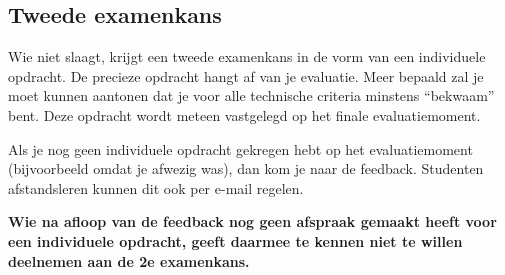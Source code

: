 \subsection{Tweede examenkans}%
\label{subs:tweede-examenkans}

Wie niet slaagt, krijgt een tweede examenkans in de vorm van een individuele opdracht. De precieze opdracht hangt af van je evaluatie. Meer bepaald zal je moet kunnen aantonen dat je voor alle technische criteria minstens ``bekwaam'' bent. Deze opdracht wordt meteen vastgelegd op het finale evaluatiemoment.

Als je nog geen individuele opdracht gekregen hebt op het evaluatiemoment (bijvoorbeeld omdat je afwezig was), dan kom je naar de feedback. Studenten afstandsleren kunnen dit ook per e-mail regelen.

\textbf{Wie na afloop van de feedback nog geen afspraak gemaakt heeft voor een individuele opdracht, geeft daarmee te kennen niet te willen deelnemen aan de 2e examenkans.}